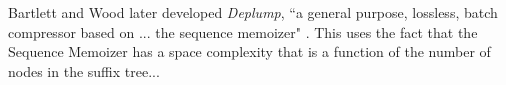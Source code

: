 Bartlett and Wood later developed \textit{Deplump}, ``a general purpose, lossless, batch compressor based on ... the sequence memoizer" \cite{bartlett2011deplump}. This uses the fact that the Sequence Memoizer has a space complexity that is a function of the number of nodes in the suffix tree... 



